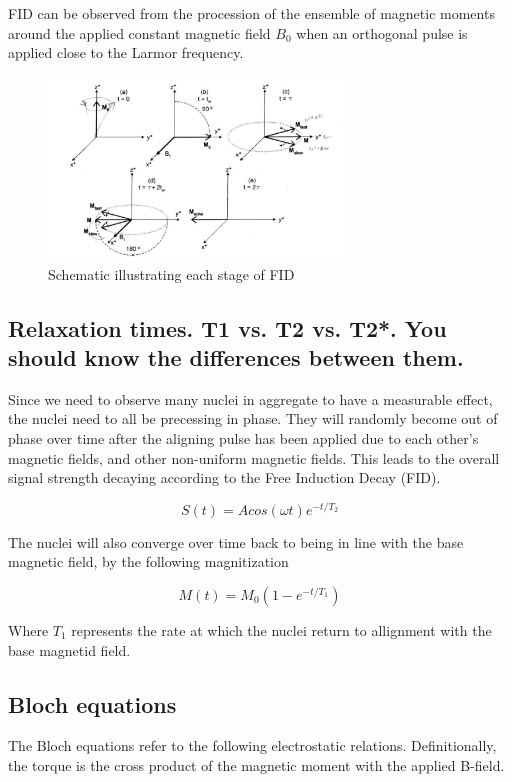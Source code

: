 \documentclass[12pt]{article}
\begin{document}
FID can be observed from the procession of the ensemble of magnetic moments around the applied constant magnetic field $B_0$ when an orthogonal pulse is applied close to the Larmor frequency.

\begin{figure}[h!]
  \centering
  \includegraphics[width=0.7\textwidth]{FID.png}
  \caption{Schematic illustrating each stage of FID \cite{pulsed_spectrometer_manual}}
  \label{fig:example}
\end{figure}



\subsection {Relaxation times. T1 vs. T2 vs. T2*. You should know the differences between them.}

Since we need to observe many nuclei in aggregate to have a measurable effect, the nuclei need to all be precessing in phase. They will randomly become out of phase over time after the aligning pulse has been applied due to each other's magnetic fields, and other non-uniform magnetic fields. This leads to the overall signal strength decaying according to the Free Induction Decay (FID).

\[S(t) = Acos(\omega t)e^{-t/T_2}\]

The nuclei will also converge over time back to being in line with the base magnetic field, by the following magnitization

\[M(t) = M_0(1-e^{-t/T_1})\]

Where $T_1$ represents the rate at which the nuclei return to allignment with the base magnetid field.


\subsection{Bloch equations}

The Bloch equations refer to the following electrostatic relations. Definitionally, the torque is the cross product of the magnetic moment with the applied B-field.
\end{document}
